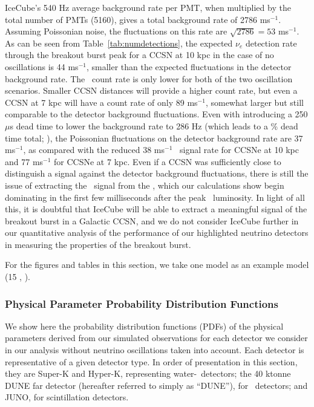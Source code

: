 IceCube's 540 Hz average background rate per PMT, when 
    multiplied by the total number of PMTs (5160), gives a total 
    background rate of 2786 ms$^{-1}$.  Assuming Poissonian noise, the fluctuations
    on this rate are $\sqrt{2786} = 53$ ms$^{-1}$.  As can be seen from Table~\ref{tab:numdetections}, the 
    expected $\nu_e$ detection rate through the breakout burst peak for a CCSN at 
    10 kpc in the case of no oscillations is 44 ms$^{-1}$, smaller than the expected fluctuations in the detector 
    background rate.  The \nue\ count rate is only lower for both
    of the two oscillation scenarios.  Smaller CCSN distances will provide a higher count rate,
    but even a CCSN at 7 kpc will have a count rate of only 89 ms$^{-1}$, somewhat 
    larger but still comparable to the detector background fluctuations.  Even with 
    introducing a 250 $\mu$s dead time to lower the background rate to 
    286 Hz (which leads to a \% dead time total; \citealt{abbasietal2011}), the 
    Poissonian fluctuations on the detector background rate are 37 ms$^{-1}$, as 
    compared with the reduced 38 ms$^{-1}$ \nue\ signal rate for CCSNe at 10 
    kpc and 77 ms$^{-1}$ for CCSNe at 7 kpc.  Even if a CCSN was sufficiently 
    close to distinguish a signal against the detector background fluctuations, there 
    is still the issue of extracting the \nue\ signal from the
    \backgrounds, 
which our calculations show begin dominating in the first few milliseconds 
    after the peak \nue\ luminosity.  In light of all this, it is doubtful that IceCube
    will be able to extract a meaningful signal of the breakout burst in a Galactic
    CCSN, and we do not consider IceCube further in our quantitative analysis of the
    performance of our highlighted neutrino detectors in measuring the properties of the
    breakout burst.


For the figures and tables in this section, 
we take one model as an example model (15 \Msol, \ls).


\subsubsection{Physical Parameter Probability Distribution Functions}

We show here the probability distribution functions (PDFs) of the
physical parameters derived from our simulated observations for each
detector we consider in our analysis without neutrino oscillations
taken into account.  Each detector is representative
of a given detector type.  In order of presentation in this section,
they are Super-K and
Hyper-K, representing water-\cer\ detectors; the 40 ktonne DUNE far
detector (hereafter referred to simply as ``DUNE''), 
for \ detectors; and JUNO, for scintillation detectors.

